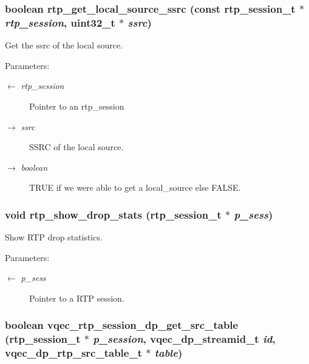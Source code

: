 \subsubsection{\setlength{\rightskip}{0pt plus 5cm}boolean rtp\_\-get\_\-local\_\-source\_\-ssrc (const rtp\_\-session\_\-t $\ast$ {\em rtp\_\-session}, uint32\_\-t $\ast$ {\em ssrc})}\label{vqec__rtp_8h_63ae673e310741ef9ef8b004218ad1bd}


Get the ssrc of the local source.

\begin{Desc}
\item[Parameters:]
\begin{description}
\item[\mbox{$\leftarrow$} {\em rtp\_\-session}]Pointer to an rtp\_\-session \item[\mbox{$\rightarrow$} {\em ssrc}]SSRC of the local source. \item[\mbox{$\rightarrow$} {\em boolean}]TRUE if we were able to get a local\_\-source else FALSE. \end{description}
\end{Desc}
\subsubsection{\setlength{\rightskip}{0pt plus 5cm}void rtp\_\-show\_\-drop\_\-stats (rtp\_\-session\_\-t $\ast$ {\em p\_\-sess})}\label{vqec__rtp_8h_e10fd8d5553cf71774f8ffa86e1e0c2b}


Show RTP drop statistics.

\begin{Desc}
\item[Parameters:]
\begin{description}
\item[\mbox{$\leftarrow$} {\em p\_\-sess}]Pointer to a RTP session. \end{description}
\end{Desc}
\subsubsection{\setlength{\rightskip}{0pt plus 5cm}boolean vqec\_\-rtp\_\-session\_\-dp\_\-get\_\-src\_\-table (rtp\_\-session\_\-t $\ast$ {\em p\_\-session}, vqec\_\-dp\_\-streamid\_\-t {\em id}, vqec\_\-dp\_\-rtp\_\-src\_\-table\_\-t $\ast$ {\em table})}\label{vqec__rtp_8h_8a96b722d5fcf873e1ed454e76b3ef21}


